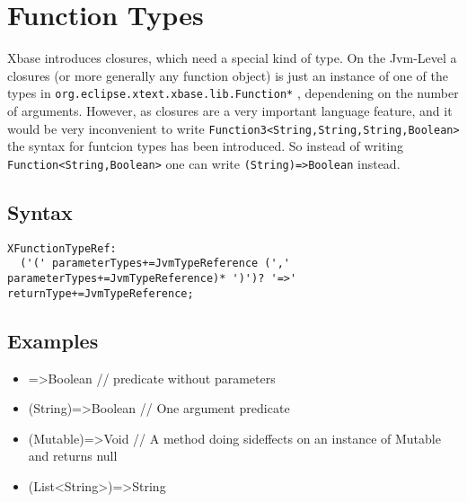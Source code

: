 \documentclass[a4paper,10pt]{scrreprt}
\newlength{\itemindentlen}
\begin{document}
\section{Function Types\label{FunctionTypes}}
Xbase introduces closures, which need a special kind of type. On the Jvm-Level a closures (or more generally any function object) is just an instance of one of the 
types in \lstinline{org.eclipse.xtext.xbase.lib.Function*}
, dependening on the number of arguments. However, as closures are a very important language feature, and
it would be very inconvenient to write \lstinline{Function3<String,String,String,Boolean>}
 the syntax for funtcion types has been introduced. 
So instead of writing \lstinline{Function<String,Boolean>}
 one can write \lstinline{(String)=>Boolean}
 instead.

\subsection{Syntax}
\begin{lstlisting}
XFunctionTypeRef:
  ('(' parameterTypes+=JvmTypeReference (',' parameterTypes+=JvmTypeReference)* ')')? '=>' returnType+=JvmTypeReference;

\end{lstlisting}





\subsection{Examples}

\setlength{\itemindentlen}{\textwidth}
\begin{itemize}
\addtolength{\itemindentlen}{-2em}

\item \begin{minipage}[t]{\itemindentlen}
=>Boolean // predicate without parameters
\end{minipage}

\item \begin{minipage}[t]{\itemindentlen}
(String)=>Boolean // One argument predicate
\end{minipage}

\item \begin{minipage}[t]{\itemindentlen}
(Mutable)=>Void // A method doing sideffects on an instance of Mutable and returns null
\end{minipage}

\item \begin{minipage}[t]{\itemindentlen}
(List<String>)=>String
\end{minipage}

\end{itemize}
\addtolength{\itemindentlen}{2em}
\end{document}
